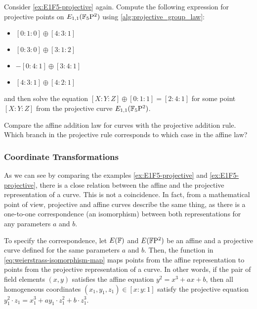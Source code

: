 
\begin{exercise} Consider \examplename{} \ref{ex:E1F5-projective} again. Compute the following expression for projective points on $E_{1,1}(\mathbb{F}_5\mathrm{P}^2)$ using \algname{} \ref{alg:projective_group_law}:
\begin{itemize}
\item $[0:1:0]\oplus [4:3:1]$
\item $[0:3:0]\oplus [3:1:2]$
\item $-[0:4:1]\oplus [3:4:1]$
\item $[4:3:1]\oplus [4:2:1]$
\end{itemize}
and then solve the equation $[X:Y:Z] \oplus [0:1:1]= [2:4:1]$ for some point $[X:Y:Z]$ from the projective  curve $E_{1,1}(\mathbb{F}_5\mathrm{P}^2)$.
\end{exercise}

\begin{exercise}
Compare the affine addition law for  curves with the projective addition rule. Which branch in the projective rule corresponds to which case in the affine law? 
\end{exercise}

\subsubsection{Coordinate Transformations} As we can see by comparing the examples 
\ref{ex:E1F5-projective} and \ref{ex:E1F5-projective}, there is a close relation between the affine and the projective representation of a  curve. This is not a coincidence. In fact, from a mathematical point of view, projective and affine  curves describe the same thing, as there is a one-to-one correspondence (an isomorphism) between both representations for any parameters $a$ and $b$. 

To specify the correspondence, let $E(\mathbb{F})$ and $E(\mathbb{F}\mathrm{P}^2)$ be an affine and a projective  curve defined for the same parameters $a$ and $b$. Then, the function in \eqref{eq:weierstrass-isomorphism-map} maps points from the affine representation to points from the projective representation of a  curve. In other words, if the pair of field elements $(x,y)$ satisfies the affine  equation $y^2= x^3 + ax + b$, then all homogeneous coordinates $(x_1,y_1,z_1)\in [x:y:1]$ satisfy the projective  equation $y_1^2\cdot z_1= x_1^3 + ay_1\cdot z_1^2 + b\cdot z_1^3$. 

